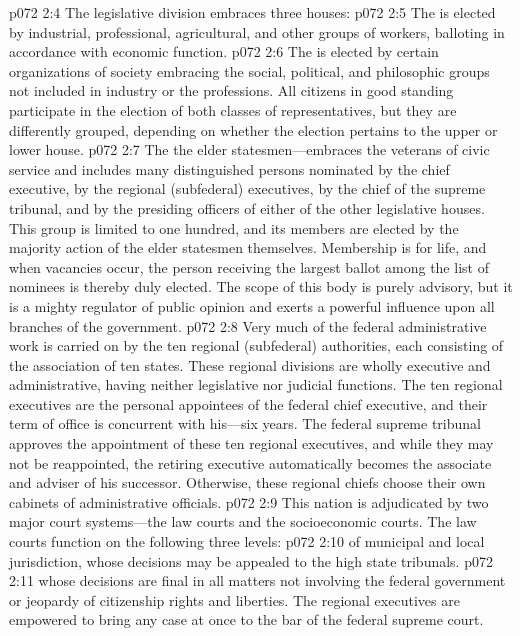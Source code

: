 \pc \vs p072 2:4 The legislative division embraces three houses:
\pc \vs p072 2:5 \bibnobreakspace The  is elected by industrial, professional, agricultural, and other groups of workers, balloting in accordance with economic function.
\pc \vs p072 2:6 \bibnobreakspace The  is elected by certain organizations of society embracing the social, political, and philosophic groups not included in industry or the professions. All citizens in good standing participate in the election of both classes of representatives, but they are differently grouped, depending on whether the election pertains to the upper or lower house.
\pc \vs p072 2:7 \bibnobreakspace The the elder states\-men---embraces the veterans of civic service and includes many distinguished persons nominated by the chief executive, by the regional (subfederal) executives, by the chief of the supreme tribunal, and by the presiding officers of either of the other legislative houses. This group is limited to one hundred, and its members are elected by the majority action of the elder statesmen themselves. Membership is for life, and when vacancies occur, the person receiving the largest ballot among the list of nominees is thereby duly elected. The scope of this body is purely advisory, but it is a mighty regulator of public opinion and exerts a powerful influence upon all branches of the government.
\pc \vs p072 2:8 Very much of the federal administrative work is carried on by the ten regional (subfederal) authorities, each consisting of the association of ten states. These regional divisions are wholly executive and administrative, having neither legislative nor judicial functions. The ten regional executives are the personal appointees of the federal chief executive, and their term of office is concurrent with his---six years. The federal supreme tribunal approves the appointment of these ten regional executives, and while they may not be reappointed, the retiring executive automatically becomes the associate and adviser of his successor. Otherwise, these regional chiefs choose their own cabinets of administrative officials.
\pc \vs p072 2:9 This nation is adjudicated by two major court systems---the law courts and the socioeconomic courts. The law courts function on the following three levels:
\pc \vs p072 2:10 \bibnobreakspace {} of municipal and local jurisdiction, whose decisions may be appealed to the high state tribunals.
\pc \vs p072 2:11 \bibnobreakspace {} whose decisions are final in all matters not involving the federal government or jeopardy of citizenship rights and liberties. The regional executives are empowered to bring any case at once to the bar of the federal supreme court.
